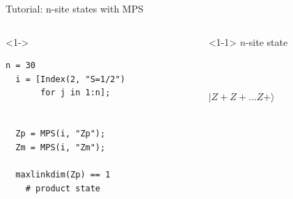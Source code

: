 \begin{frame}[fragile]{Tutorial: n-site states with MPS}

\begin{columns}

\begin{column}{4.5cm}

\begin{onlyenv}<1->
\begin{lstlisting}[language=JuliaLocal, style=julia, mathescape, basicstyle=\scriptsize\ttfamily]
  n = 30
  i = [Index(2, "S=1/2")
       for j in 1:n];

  
  Zp = MPS(i, "Zp");
  Zm = MPS(i, "Zm");

  maxlinkdim(Zp) == 1
    # product state
\end{lstlisting}
\end{onlyenv}

\end{column}

\begin{column}{5.5cm}

\begin{onlyenv}<1-1>
\vspace*{-0.1cm}
$n$-site state \\
~\\
~\\
~\\
$|Z+Z+\dots Z+\rangle$ \\
~\\
~\\
\end{onlyenv}


\end{column}
\end{columns}
\end{frame}
